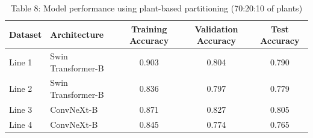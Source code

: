 \begin{table}[ht]
\centering
\caption{Table 8: Model performance using plant-based partitioning (70:20:10 of plants)}
\begin{tabular}{llccc}
\hline
Dataset & Architecture & Training Accuracy & Validation Accuracy & Test Accuracy \\
\hline
Line 1 & Swin Transformer-B & 0.903 & 0.804 & 0.790 \\
Line 2 & Swin Transformer-B & 0.836 & 0.797 & 0.779 \\
Line 3 & ConvNeXt-B & 0.871 & 0.827 & 0.805 \\
Line 4 & ConvNeXt-B & 0.845 & 0.774 & 0.765 \\
\hline
\end{tabular}
\end{table}
